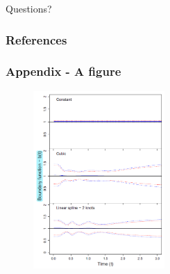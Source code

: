 \documentclass[
    11pt, %
    aspectratio=169, %
]{beamer}
\begin{document}
\appendix
{}

\begin{frame}[noframenumbering] %

	\begin{center}
            {\LARGE Questions?}
	\end{center}
 
\end{frame}


\begin{frame} 
        \frametitle{References}

        \printbibliography
\end{frame}

\begin{frame}[noframenumbering]
\label{Figure}
	\frametitle{Appendix - A figure}
        \hyperlink{Test}{}
        
        \begin{figure}[h!]
            \centering
            \includegraphics[angle=0, width=5cm]{Newey et al Graph.png}
        \end{figure}
\end{frame}
\end{document}
